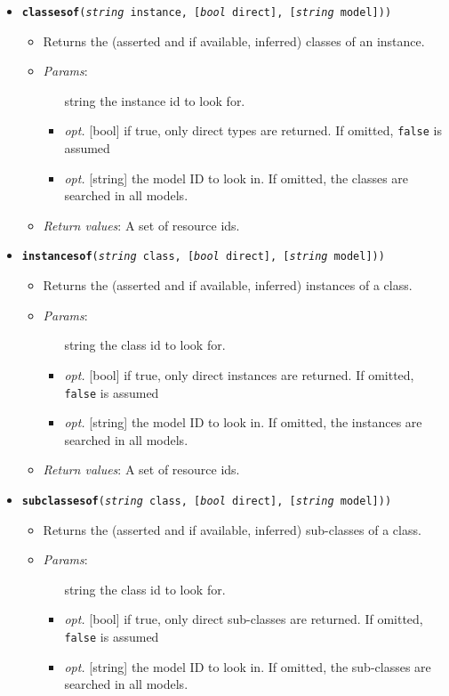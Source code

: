 \begin{itemize}
\item  \texttt{\textbf{classesof}(\emph{string} instance, [\emph{bool} direct], [\emph{string} model]))}
\begin{itemize}
\item  Returns the (asserted and if available, inferred) classes of an instance.
\item  \emph{Params}:
\begin{itemize}
\item  [string] the instance id to look for.
\item  \emph{opt.} [bool] if true, only direct types are returned. If omitted, \texttt{false} is assumed 
\item  \emph{opt.} [string] the model ID to look in. If omitted, the classes are searched in all models. 
\end{itemize}

\item  \emph{Return values}: A set of resource ids.
\end{itemize}

\item  \texttt{\textbf{instancesof}(\emph{string} class, [\emph{bool} direct], [\emph{string} model]))}
\begin{itemize}
\item  Returns the (asserted and if available, inferred) instances of a class.
\item  \emph{Params}:
\begin{itemize}
\item  [string] the class id to look for.
\item  \emph{opt.} [bool] if true, only direct instances are returned. If omitted, \texttt{false} is assumed 
\item  \emph{opt.} [string] the model ID to look in. If omitted, the instances are searched in all models. 
\end{itemize}

\item  \emph{Return values}: A set of resource ids.
\end{itemize}

\item  \texttt{\textbf{subclassesof}(\emph{string} class, [\emph{bool} direct], [\emph{string} model]))}
\begin{itemize}
\item  Returns the (asserted and if available, inferred) sub-classes of a class.
\item  \emph{Params}:
\begin{itemize}
\item  [string] the class id to look for.
\item  \emph{opt.} [bool] if true, only direct sub-classes are returned. If omitted, \texttt{false} is assumed 
\item  \emph{opt.} [string] the model ID to look in. If omitted, the sub-classes are searched in all models. 
\end{itemize}


\end{itemize}
\end{itemize}

